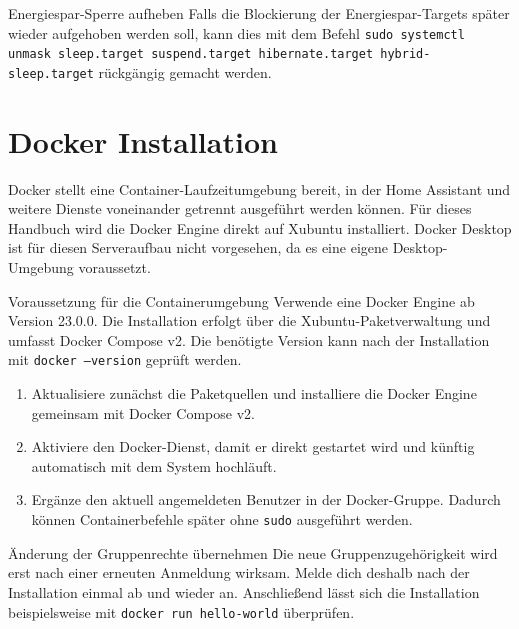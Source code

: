 \begin{InfoBox}{Energiespar-Sperre aufheben}
    \scriptsize Falls die Blockierung der Energiespar-Targets später wieder aufgehoben werden soll, kann dies mit dem Befehl \texttt{sudo systemctl unmask sleep.target suspend.target hibernate.target hybrid-sleep.target} rückgängig gemacht werden.
\end{InfoBox}

\section{Docker Installation}

Docker stellt eine Container-Laufzeitumgebung bereit, in der Home Assistant und weitere Dienste voneinander getrennt ausgeführt werden können. Für dieses Handbuch wird die Docker Engine direkt auf Xubuntu installiert. Docker Desktop ist für diesen Serveraufbau nicht vorgesehen, da es eine eigene Desktop-Umgebung voraussetzt.

\begin{InfoBox}{Voraussetzung für die Containerumgebung}
    \scriptsize Verwende eine Docker Engine ab Version 23.0.0. Die Installation erfolgt über die Xubuntu-Paketverwaltung und umfasst Docker Compose v2. Die benötigte Version kann nach der Installation mit \texttt{docker --version} geprüft werden.
\end{InfoBox}

\begin{enumerate}
    \item Aktualisiere zunächst die Paketquellen und installiere die Docker Engine gemeinsam mit Docker Compose v2.
    \item Aktiviere den Docker-Dienst, damit er direkt gestartet wird und künftig automatisch mit dem System hochläuft.
    \item Ergänze den aktuell angemeldeten Benutzer in der Docker-Gruppe. Dadurch können Containerbefehle später ohne \texttt{sudo} ausgeführt werden.
\end{enumerate}

\label{lst:docker-install}

\begin{InfoBox}{Änderung der Gruppenrechte übernehmen}
    \scriptsize Die neue Gruppenzugehörigkeit wird erst nach einer erneuten Anmeldung wirksam. Melde dich deshalb nach der Installation einmal ab und wieder an. Anschließend lässt sich die Installation beispielsweise mit \texttt{docker run hello-world} überprüfen.
\end{InfoBox}

